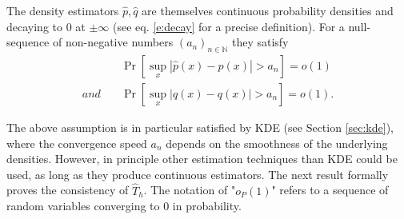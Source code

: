 \begin{ass} \label{ass2}
    The density estimators $\hat p, \hat q$ are themselves continuous probability densities and decaying to $0$ at $\pm \infty$ (see eq. \eqref{e:decay} for a precise definition). For a null-sequence of non-negative numbers $(a_n)_{n \in \mathbb{N}}$ they satisfy
    \begin{align*}
     & \Pr[\sup_{x } |\hat p(x)-p(x)|>a_n]=o(1)\\
    and \quad &\Pr[\sup_{x } |\hat q(x)-q(x)|>a_n]=o(1). 
    \end{align*} 
\end{ass}
The above assumption is in particular satisfied by KDE (see Section \ref{sec:kde}), where the convergence speed $a_n$ depends on the smoothness of the underlying densities. However, in principle other estimation techniques than KDE could be used, as long as they produce continuous estimators. The next result formally proves the consistency of $\hat T_h$. The notation of "$o_P(1)$" refers to a sequence of random variables converging to $0$ in probability.

